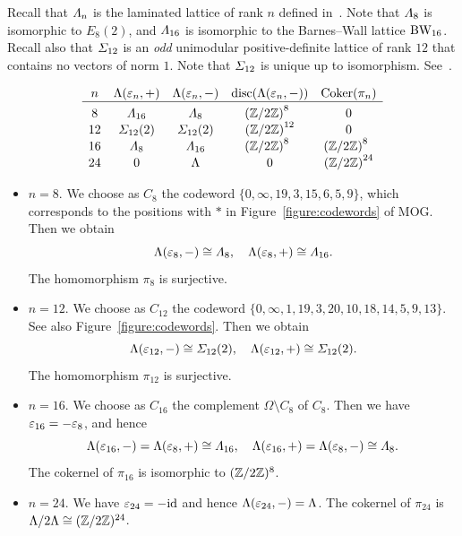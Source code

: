 \documentclass{amsart} %
\begin{document}
 Recall that $\varLambda_{n}$ is 
 the laminated lattice of rank $n$
 defined in~\cite[Figure 6.2]{theCSbook}.
 Note that $\varLambda_8$
is isomorphic to $E_8(2)$,
and $\varLambda_{16}$ is 
isomorphic to the Barnes--Wall lattice $\mathrm{BW}_{16}$.
 Recall also that
$\varSigma_{12}$ is an \emph{odd} unimodular positive-definite lattice of rank $12$
that contains no vectors of norm $1$.
Note that $\varSigma_{12}$ is unique up to isomorphism.
See~\cite[Table 16.7]{theCSbook}.
%
\begin{table}
\[
\begin{array}{ccccc}
n & \Leech(\vep_n, +)& \Leech(\vep_n, -) & \disc(\Leech(\vep_n, -)) & \Coker (\pi_n) \\
\hline
8 & \Lamsxtn & \Laminated_{8} & {(\ZZ/2\ZZ)}^{8\;\;} & 0 \mystruth{12pt}\\
12 & \Sigmatwlv(2) & \Sigmatwlv(2) & {(\ZZ/2\ZZ)}^{12} & 0 \\
16 & \Laminated_{8} & \Lamsxtn & {(\ZZ/2\ZZ)}^{8\;\;} &{(\ZZ/2\ZZ)}^{8\;\;} \\
24& 0 & \Leech &0 &{(\ZZ/2\ZZ)}^{24} \\
\end{array}
\]
\caption{$\Leech(\vep_n, +)$ and $\Leech(\vep_n, -)$}\label{table:minuspart}
\end{table}
%
\begin{itemize}
%
\item $n=8$. 
We choose as $C_{8}$ the codeword 
$\{ 0,\infty, 19, 3, 15, 6, 5, 9\} $, 
which corresponds to 
the positions with $*$ in Figure~\ref{figure:codewords} of MOG.
Then we obtain 
\[
\Lambda(\varepsilon_8, -)\cong \varLambda_{8},
\quad 
\Lambda(\varepsilon_8, +)\cong \varLambda_{16}.
\]
The homomorphism $\pi_{8}$ is surjective.
%
\item $n=12$. 
We choose as $C_{12}$ the codeword 
$\{ 0,\infty, 1,19, 3, 20,10, 18, 14, 5, 9, 13\}$.
See also Figure~\ref{figure:codewords}.
Then we obtain 
\[
\Lambda(\varepsilon_{12}, -)\cong \varSigma_{12}(2),
\quad 
\Lambda(\varepsilon_{12}, +)\cong \varSigma_{12}(2).
\]
The homomorphism $\pi_{12}$ is surjective.
%
\item $n=16$. 
We choose as $C_{16}$ the complement $\Omega\setminus C_8$ of $C_8$. 
Then we have $\varepsilon_{16}=-\varepsilon_{8}$, and hence 
\[
\Lambda(\varepsilon_{16}, -)=\Lambda(\varepsilon_{8}, +)\cong \varLambda_{16},
\quad 
\Lambda(\varepsilon_{16}, +)=\Lambda(\varepsilon_8, -)\cong \varLambda_{8}.
\]
%
The cokernel of $\pi_{16}$ is isomorphic to $(\mathord{\mathbb{Z}}/2\mathord{\mathbb{Z}})^8$.
%
\item $n=24$. We have $\varepsilon_{24}=-\mathord{\mathrm{id}}$ and hence 
$\Lambda(\varepsilon_{24}, -)=\Lambda$.
The cokernel of $\pi_{24}$ is $\Lambda/2\Lambda \cong (\mathord{\mathbb{Z}}/2\mathord{\mathbb{Z}})^{24}$.
\end{itemize}
\end{document}
